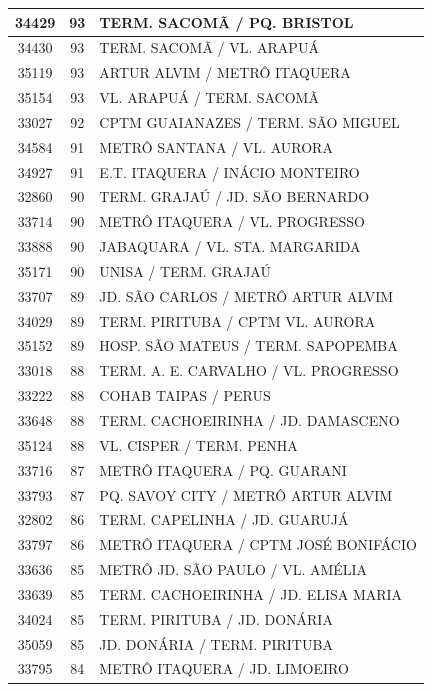 \documentclass[
	12pt,				%
	oneside,			%
	a4paper,			%
	english,			%
	brazil				%
	]{abntex2ppgsi}
\begin{document}
{{{\begin{apendicesenv}
\begin{longtable}{c|c|p{7cm}}
 \hline 
34429 &	93 &	TERM. SACOMÃ / PQ. BRISTOL \\ 
 \hline 
34430 &	93 &	TERM. SACOMÃ / VL. ARAPUÁ \\ 
 \hline 
35119 &	93 &	ARTUR ALVIM / METRÔ ITAQUERA \\ 
 \hline 
35154 &	93 &	VL. ARAPUÁ / TERM. SACOMÃ \\ 
 \hline 
33027 &	92 &	CPTM GUAIANAZES / TERM. SÃO MIGUEL \\ 
 \hline 
34584 &	91 &	METRÔ SANTANA / VL. AURORA \\ 
 \hline 
34927 &	91 &	E.T. ITAQUERA / INÁCIO MONTEIRO \\ 
 \hline 
32860 &	90 &	TERM. GRAJAÚ / JD. SÃO BERNARDO \\ 
 \hline 
33714 &	90 &	METRÔ ITAQUERA / VL. PROGRESSO \\ 
 \hline 
33888 &	90 &	JABAQUARA / VL. STA. MARGARIDA \\ 
 \hline 
35171 &	90 &	UNISA / TERM. GRAJAÚ \\ 
 \hline 
33707 &	89 &	JD. SÃO CARLOS / METRÔ ARTUR ALVIM \\ 
 \hline 
34029 &	89 &	TERM. PIRITUBA / CPTM VL. AURORA \\ 
 \hline 
35152 &	89 &	HOSP. SÃO MATEUS / TERM. SAPOPEMBA \\ 
 \hline 
33018 &	88 &	TERM. A. E. CARVALHO / VL. PROGRESSO \\ 
 \hline 
33222 &	88 &	COHAB TAIPAS / PERUS \\ 
 \hline 
33648 &	88 &	TERM. CACHOEIRINHA / JD. DAMASCENO \\ 
 \hline 
35124 &	88 &	VL. CISPER / TERM. PENHA \\ 
 \hline 
33716 &	87 &	METRÔ ITAQUERA / PQ. GUARANI \\ 
 \hline 
33793 &	87 &	PQ. SAVOY CITY / METRÔ ARTUR ALVIM \\ 
 \hline 
32802 &	86 &	TERM. CAPELINHA / JD. GUARUJÁ \\ 
 \hline 
33797 &	86 &	METRÔ ITAQUERA / CPTM JOSÉ BONIFÁCIO \\ 
 \hline 
33636 &	85 &	METRÔ JD. SÃO PAULO / VL. AMÉLIA \\ 
 \hline 
33639 &	85 &	TERM. CACHOEIRINHA / JD. ELISA MARIA \\ 
 \hline 
34024 &	85 &	TERM. PIRITUBA / JD. DONÁRIA \\ 
 \hline 
35059 &	85 &	JD. DONÁRIA / TERM. PIRITUBA \\ 
 \hline 
33795 &	84 &	METRÔ ITAQUERA / JD. LIMOEIRO \\ 

\end{longtable}
\end{apendicesenv}}}}
\end{document}
